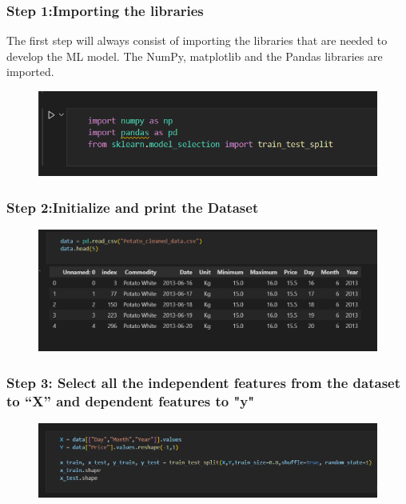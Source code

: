 \subsubsection{Step 1:Importing the libraries}
The first step will always consist of importing the libraries that are needed to 
develop the ML model. The NumPy, matplotlib and the Pandas libraries are imported.\par
\begin{figure}[H]
	\centering
	\includegraphics[width=160mm]{images/import library.png}
	\label{figimport} %
\end{figure}


\subsubsection{Step 2:Initialize and print the Dataset}
\begin{figure}[H]
	\centering
	\includegraphics[width=160mm]{images/intdata.png}
	\label{figintdata} %
\end{figure}

\subsubsection{Step 3: Select all the independent features from the dataset to “X” and dependent features to "y"}
\begin{figure}[H]
	\centering
	\includegraphics[width=160mm]{images/feature.png}
	\label{figfeature} %
\end{figure}

